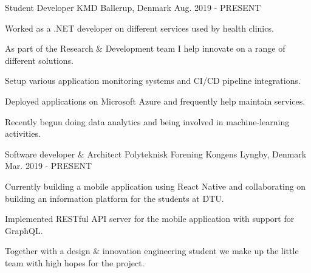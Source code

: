 

\begin{cventries}

  \cventry
    {Student Developer} %
    {KMD} %
    {Ballerup, Denmark} %
    {Aug. 2019 - PRESENT} %
    {
      \begin{cvitems} %
        \item {Worked as a .NET developer on different services used by health clinics.}
        \item {As part of the Research \& Development team I help innovate on a range of different solutions.}
        \item {Setup various application monitoring systems and CI/CD pipeline integrations.}
        \item {Deployed applications on Microsoft Azure and frequently help maintain services.}
        \item {Recently begun doing data analytics and being involved in machine-learning activities.}
      \end{cvitems}
    }


  \cventry
    {Software developer \& Architect} %
    {Polyteknisk Forening} %
    {Kongens Lyngby, Denmark} %
    {Mar. 2019 - PRESENT} %
    {
      \begin{cvitems} %
      	\item {Currently building a mobile application using React Native and collaborating on building an information platform for the students at DTU.}
        \item {Implemented RESTful API server for the mobile application with support for GraphQL.}
        \item {Together with a design \& innovation engineering student we make up the little team with high hopes for the project.}
      \end{cvitems}
    }


\end{cventries}
